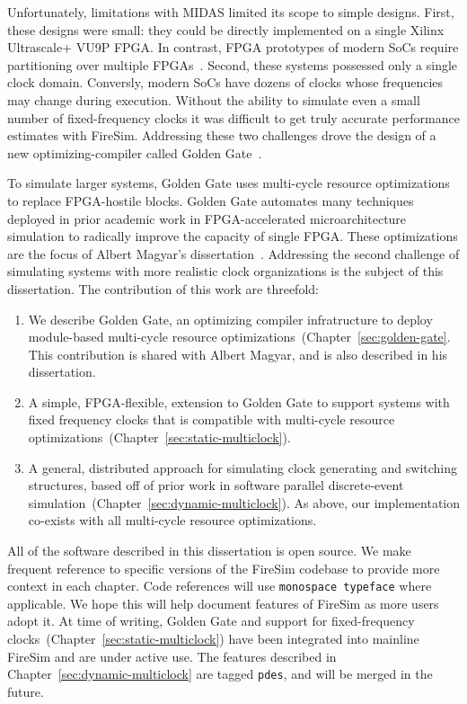 Unfortunately, limitations with MIDAS limited its scope
to simple designs. First, these designs were small: they could be directly
implemented on a single Xilinx Ultrascale+ VU9P FPGA. In contrast, FPGA prototypes
of modern SoCs require partitioning over multiple FPGAs~\cite{FPMM}.  Second, these systems possessed only a single
clock domain. Conversly, modern SoCs have dozens of clocks whose frequencies
may change during execution. Without the ability to simulate
even a small number of fixed-frequency clocks it was difficult to get truly
accurate performance estimates with FireSim. Addressing these two challenges
drove the design of a new optimizing-compiler called Golden Gate~\cite{GoldenGate}.

To simulate larger systems, Golden Gate uses multi-cycle resource optimizations
to replace FPGA-hostile blocks. Golden Gate automates many techniques
deployed in prior academic work in FPGA-accelerated microarchitecture
simulation to radically improve the capacity of single FPGA. These
optimizations are the focus of Albert Magyar's dissertation~\cite{MagyarDissertation}.
Addressing the second challenge of simulating systems with more realistic clock
organizations is the subject of this dissertation. The contribution of this
work are threefold:

\begin{enumerate}
\item We describe Golden Gate, an optimizing compiler infratructure to deploy module-based
    multi-cycle resource optimizations~(Chapter~\ref{sec:golden-gate}. This
    contribution is shared with Albert Magyar, and is also described in his
    dissertation.

\item A simple, FPGA-flexible, extension to Golden Gate to support systems
    with fixed frequency clocks that is compatible with multi-cycle resource optimizations~(Chapter~\ref{sec:static-multiclock}).

\item A general, distributed approach for simulating clock generating and switching structures,
    based off of  prior work in software parallel discrete-event
    simulation~(Chapter~\ref{sec:dynamic-multiclock}). As above, our
    implementation co-exists with all multi-cycle resource
    optimizations.
\end{enumerate}

All of the software described in this dissertation is open source. We make
frequent reference to specific versions of the FireSim codebase to provide more
context in each chapter. Code references will use \texttt{monospace typeface}
where applicable. We hope this will help document features of FireSim as more
users adopt it. At time of writing, Golden Gate and support for fixed-frequency
clocks~(Chapter~\ref{sec:static-multiclock}) have been integrated into mainline
FireSim and are under active use. The features described in
Chapter~\ref{sec:dynamic-multiclock} are tagged \texttt{pdes}, and will be
merged in the future.

